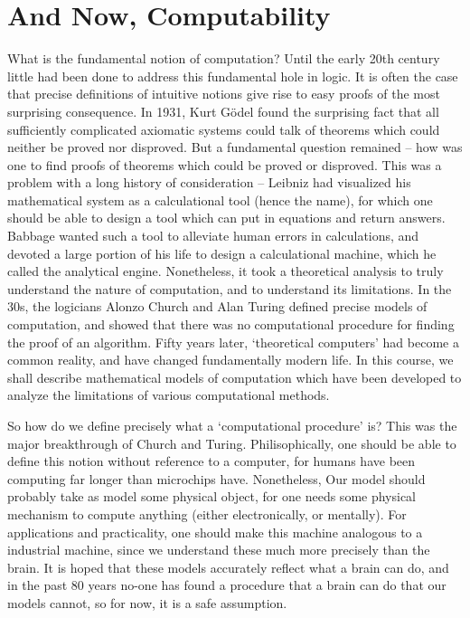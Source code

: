 \chapter{And Now, Computability}

What is the fundamental notion of computation? Until the early 20th century little had been done to address this fundamental hole in logic. It is often the case that precise definitions of intuitive notions give rise to easy proofs of the most surprising consequence. In 1931, Kurt G\"{o}del found the surprising fact that all sufficiently complicated axiomatic systems could talk of theorems which could neither be proved nor disproved. But a fundamental question remained -- how was one to find proofs of theorems which could be proved or disproved. This was a problem with a long history of consideration -- Leibniz had visualized his mathematical system as a calculational tool (hence the name), for which one should be able to design a tool which can put in equations and return answers. Babbage wanted such a tool to alleviate human errors in calculations, and devoted a large portion of his life to design a calculational machine, which he called the analytical engine. Nonetheless, it took a theoretical analysis to truly understand the nature of computation, and to understand its limitations. In the 30s, the logicians Alonzo Church and Alan Turing defined precise models of computation, and showed that there was no computational procedure for finding the proof of an algorithm. Fifty years later, `theoretical computers' had become a common reality, and have changed fundamentally modern life. In this course, we shall describe mathematical models of computation which have been developed to analyze the limitations of various computational methods.

So how do we define precisely what a `computational procedure' is? This was the major breakthrough of Church and Turing. Philisophically, one should be able to define this notion without reference to a computer, for humans have been computing far longer than microchips have. Nonetheless, Our model should probably take as model some physical object, for one needs some physical mechanism to compute anything (either electronically, or mentally). For applications and practicality, one should make this machine analogous to a industrial machine, since we understand these much more precisely than the brain. It is hoped that these models accurately reflect what a brain can do, and in the past 80 years no-one has found a procedure that a brain can do that our models cannot, so for now, it is a safe assumption.

